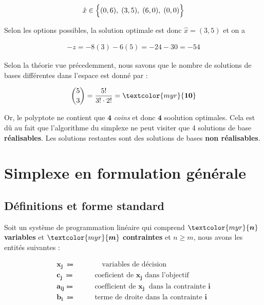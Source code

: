 \documentclass{report}
\begin{document}
\begin{multicols*}{2}
    \begin{align*}
        \hat{x} \in \Bigl\{ (0,6), \; (3,5), \;  (6, 0), \; (0, 0)\Bigr\}
    \end{align*}


    Selon les options possibles, la solution optimale est donc 
    $\hat{x} = (3, 5)$ et on a  

    \begin{align*}
        \boxed{-z = -8(3) - 6(5) = -24 - 30 = -54}
    \end{align*}


    Selon la théorie vue précedemment, nous savons 
    que le nombre de solutions de bases 
    différentes dans l'espace est donné par :

    \begin{align*}
        {5 \choose 3} = 
        \dfrac{5!}{3! \cdot 2!} 
        = \textcolor{myr}{\boldsymbol{10}}  
    \end{align*}

    Or, le polyptote ne contient que 
    $\boldsymbol{4}$ \textit{coins} et donc               $\boldsymbol{4}$ soolution optimales. Cela est 
    dû au fait que l'algorithme du simplexe ne peut 
    visiter que 4 solutions de base 
    \textbf{réalisables}. Les solutions restantes 
    sont des solutions de bases 
    \textbf{non réalisables}. 

    \chapter{Simplexe en formulation générale}



    \section{Définitions et forme standard}
    Soit un système de programmation linéaire qui comprend 
    $\textcolor{myr}{\boldsymbol{n}}$ \textbf{variables} 
    et $\textcolor{myr}{\boldsymbol{m}}$ \textbf{contraintes} et 
    $n \geq m$, nous avons les entités suivantes :

    \begin{alignat*}{2}
        &\boldsymbol{x_{j\phantom{j}}} \Coloneqq&\quad \text{variables de décision} 
        &
        \\   
        &\boldsymbol{c_{j\phantom{j}}} \Coloneqq \quad\quad& \text{coeficient de } \boldsymbol{x_j}  
        \text{ dans l'objectif}  &
        \\  
        &\boldsymbol{a_{ij}} \Coloneqq& \text{coefficient de } 
        \boldsymbol{x_{j\phantom{j}}} 
        \text{ dans la contrainte } \boldsymbol{i} &
        \\  
                                                   &\boldsymbol{b_{i\phantom{j}}} \Coloneqq& \text{terme de droite dans la contrainte } \boldsymbol{i} &
    \end{alignat*}


\end{multicols*}
\end{document}
